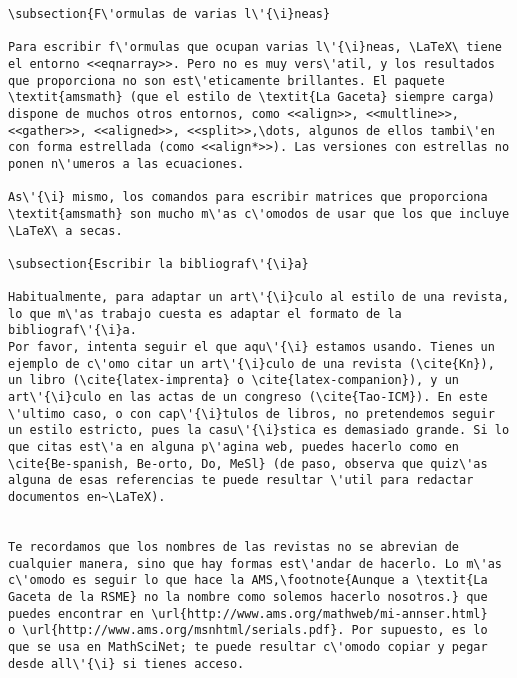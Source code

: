 \documentclass[11pt, a4paper]{article}
\begin{document}
\begin{lstlisting}
\subsection{F\'ormulas de varias l\'{\i}neas}

Para escribir f\'ormulas que ocupan varias l\'{\i}neas, \LaTeX\ tiene el entorno <<eqnarray>>. Pero no es muy vers\'atil, y los resultados que proporciona no son est\'eticamente brillantes. El paquete \textit{amsmath} (que el estilo de \textit{La Gaceta} siempre carga) dispone de muchos otros entornos, como <<align>>, <<multline>>, <<gather>>, <<aligned>>, <<split>>,\dots, algunos de ellos tambi\'en con forma estrellada (como <<align*>>). Las versiones con estrellas no ponen n\'umeros a las ecuaciones.

As\'{\i} mismo, los comandos para escribir matrices que proporciona \textit{amsmath} son mucho m\'as c\'omodos de usar que los que incluye \LaTeX\ a secas.

\subsection{Escribir la bibliograf\'{\i}a}

Habitualmente, para adaptar un art\'{\i}culo al estilo de una revista, lo que m\'as trabajo cuesta es adaptar el formato de la bibliograf\'{\i}a. 
Por favor, intenta seguir el que aqu\'{\i} estamos usando. Tienes un ejemplo de c\'omo citar un art\'{\i}culo de una revista (\cite{Kn}), un libro (\cite{latex-imprenta} o \cite{latex-companion}), y un art\'{\i}culo en las actas de un congreso (\cite{Tao-ICM}). En este \'ultimo caso, o con cap\'{\i}tulos de libros, no pretendemos seguir un estilo estricto, pues la casu\'{\i}stica es demasiado grande. Si lo que citas est\'a en alguna p\'agina web, puedes hacerlo como en \cite{Be-spanish, Be-orto, Do, MeSl} (de paso, observa que quiz\'as alguna de esas referencias te puede resultar \'util para redactar documentos en~\LaTeX).


Te recordamos que los nombres de las revistas no se abrevian de cualquier manera, sino que hay formas est\'andar de hacerlo. Lo m\'as c\'omodo es seguir lo que hace la AMS,\footnote{Aunque a \textit{La Gaceta de la RSME} no la nombre como solemos hacerlo nosotros.} que puedes encontrar en \url{http://www.ams.org/mathweb/mi-annser.html}
o \url{http://www.ams.org/msnhtml/serials.pdf}. Por supuesto, es lo que se usa en MathSciNet; te puede resultar c\'omodo copiar y pegar desde all\'{\i} si tienes acceso.


\end{lstlisting}
\end{document}

